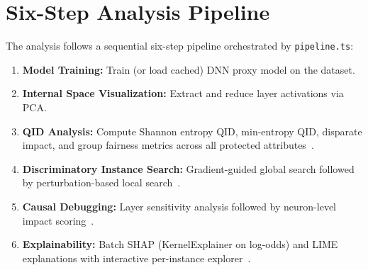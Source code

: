\section{Six-Step Analysis Pipeline}

The analysis follows a sequential six-step pipeline orchestrated by \texttt{pipeline.ts}:

\begin{enumerate}
    \item \textbf{Model Training:} Train (or load cached) DNN proxy model on the dataset.
    \item \textbf{Internal Space Visualization:} Extract and reduce layer activations via PCA.
    \item \textbf{QID Analysis:} Compute Shannon entropy QID, min-entropy QID, disparate impact, and group fairness metrics across all protected attributes~\cite{dice}.
    \item \textbf{Discriminatory Instance Search:} Gradient-guided global search followed by perturbation-based local search~\cite{dice, neufair}.
    \item \textbf{Causal Debugging:} Layer sensitivity analysis followed by neuron-level impact scoring~\cite{dice}.
    \item \textbf{Explainability:} Batch SHAP (KernelExplainer on log-odds) and LIME explanations with interactive per-instance explorer~\cite{kamolov2025, wang2024}.
\end{enumerate}

